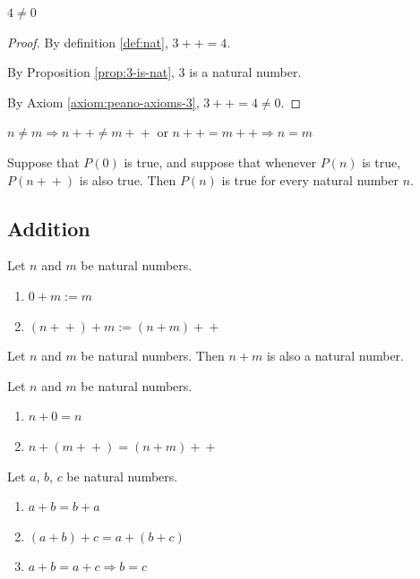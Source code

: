 \documentclass{article}
\newcommand{\pp}{\!+\!+}
\begin{document}
\begin{proposition}
    $4 \neq 0$
\end{proposition}

\begin{proof}
    By definition \ref{def:nat}, $3\pp = 4$.

    By Proposition \ref{prop:3-is-nat}, 3 is a natural number.

    By Axiom \ref{axiom:peano-axioms-3}, $3\pp = 4 \neq 0$.
\end{proof}

\begin{axiom}
    \label{axiom:peano-axioms-4}
    $n \neq m \Rightarrow n\pp \neq m\pp$ or $n\pp = m\pp \Rightarrow n = m$
\end{axiom}

\begin{axiom}
    \label{axiom:peano-axioms-5}
    Suppose that $P(0)$ is true, and suppose that whenever $P(n)$ is true, $P(n\pp)$ is also true. Then $P(n)$ is true for every natural number $n$.
\end{axiom}

\subsection{Addition}
\begin{definition}[Addition]
    Let $n$ and $m$ be natural numbers.
    \begin{enumerate}
        \item $0+m:=m$
        \item $(n\pp)+m:=(n+m)\pp$
    \end{enumerate}
\end{definition}

\begin{proposition}
    Let $n$ and $m$ be natural numbers. Then $n+m$ is also a natural number.
\end{proposition}

\begin{lemma}
    Let $n$ and $m$ be natural numbers.
    \begin{enumerate}
        \item $n+0=n$
        \item $n+(m\pp)=(n+m)\pp$
    \end{enumerate}
\end{lemma}

\begin{proposition}
    Let $a$, $b$, $c$ be natural numbers.
    \begin{enumerate}
        \item $a+b=b+a$
        \item $(a+b)+c=a+(b+c)$
        \item $a+b=a+c \Rightarrow b=c$
    \end{enumerate}
\end{proposition}
\end{document}
